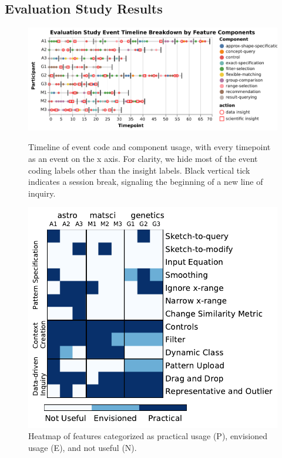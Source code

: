 \subsection{Evaluation Study Results\label{eval_findings}}
\begin{figure}[t!]
  \includegraphics[width=\linewidth]{figures/evalstudytimeline.pdf}
  \caption{Timeline of event code and component usage, with every timepoint as an event on the x axis. For clarity, we hide most of the event coding labels other than the insight labels. Black vertical tick indicates a session break, signaling the beginning of a new line of inquiry.}\label{fig:evalstudytimeline}
\endminipage\hfill
{}
  \includegraphics[width=0.8\linewidth]{figures/PENcoding.pdf}
  \caption{Heatmap of features categorized as practical usage (P), envisioned usage (E), and not useful (N).  }\label{fig:feature_heatmap}
\endminipage
\end{figure}
